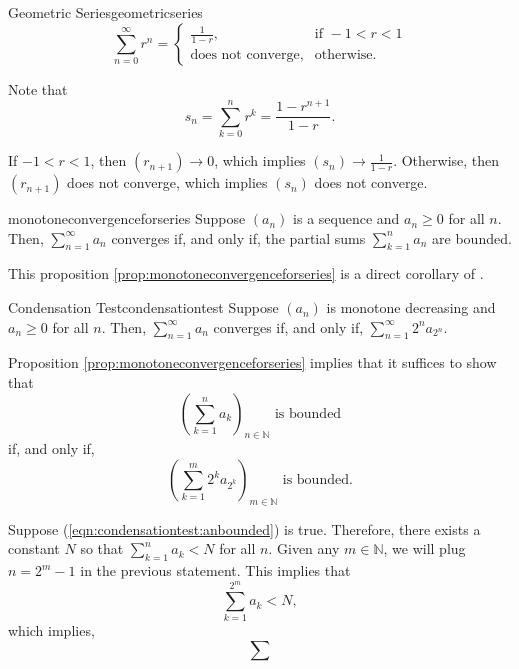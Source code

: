 \begin{prop}{Geometric Series}{geometricseries}
	\[
		\sum_{n=0}^\infty r^n =
		\begin{cases}
			\frac{1}{1-r}, & \text{if } -1 < r < 1 \\
			\text{does not converge}, & \text{otherwise}.
		\end{cases}
	\]
\end{prop}

\begin{dem}{}{}
	Note that  \[
		s_n = \sum_{k = 0}^n r^k = \frac{1 - r^{n+1}}{1 - r}.
	\]

	If \(-1 < r < 1\), then \((r_{n+1}) \to 0\),  which implies \((s_n) \to \frac{1}{1 - r}\).
	Otherwise, then \((r_{n+1})\) does not converge, which implies \((s_n)\) does not converge.
\end{dem}

\begin{prop}{}{monotoneconvergenceforseries}
	Suppose \((a_n)\) is a sequence and \(a_n \geq 0\) for all \(n\). Then, \(\sum_{n=1}^\infty a_n\) converges if, and only if, the partial sums \(\sum_{k=1}^n a_n\) are bounded.
\end{prop}

This proposition \ref{prop:monotoneconvergenceforseries} is a direct corollary of .

\begin{thm}{Condensation Test}{condensationtest}
	Suppose \((a_n)\) is monotone decreasing and \(a_n \geq 0\) for all \(n\). Then, \(\sum_{n = 1}^\infty a_n\) converges if, and only if, \(\sum_{n=1}^\infty 2^n a_{2^n}\).
\end{thm}

\begin{dem}{}{}
	Proposition \ref{prop:monotoneconvergenceforseries} implies that it suffices to show that
	\begin{equation}\label{eqn:condensationtest:anbounded}
		\left(\sum_{k=1}^n a_k\right)_{n \in \mathbb{N}} \text{ is bounded}
	\end{equation} if, and only if,
	\begin{equation}\label{eqn:condensationtest:2na2nbouned}
		\left(\sum_{k=1}^m 2^ka_{2^k}\right)_{m \in \mathbb{N}} \text{ is bounded}.
	\end{equation}

	Suppose (\ref{eqn:condensationtest:anbounded}) is true. Therefore, there exists a constant \(N\) so that \(\sum_{k=1}^n a_k < N\) for all \(n\). Given any \(m \in \mathbb{N}\), we will plug \(n = 2^m - 1\) in the previous statement. This implies that \[
		\sum_{k=1}^{2^m} a_k < N,
	\]
	which implies, \[
		\sum_{}
	\]
\end{dem}

